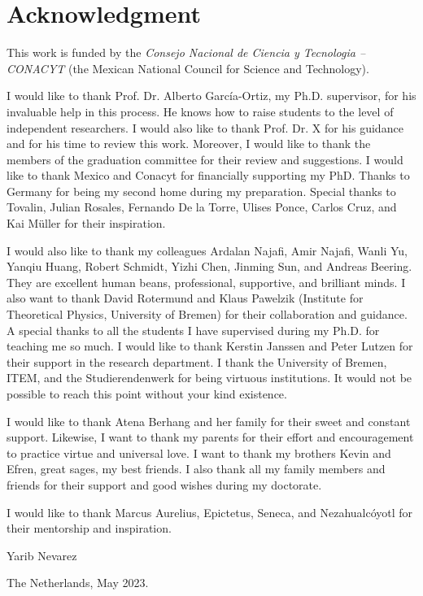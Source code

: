 \chapter*{Acknowledgment}
\thispagestyle{empty}
This work is funded by the \textit{Consejo Nacional de Ciencia y Tecnologia -- CONACYT} (the Mexican National Council for Science and Technology).

I would like to thank Prof. Dr. Alberto Garc\'ia-Ortiz, my Ph.D. supervisor, for his invaluable help in this process. He knows how to raise students to the level of independent researchers. I would also like to thank Prof. Dr. X for his guidance and for his time to review this work. Moreover, I would like to thank the members of the graduation committee for their review and suggestions. I would like to thank Mexico and Conacyt for financially supporting my PhD. Thanks to Germany for being my second home during my preparation. Special thanks to Tovalin, Julian Rosales, Fernando De la Torre, Ulises Ponce, Carlos Cruz, and Kai M\"uller for their inspiration.

I would also like to thank my colleagues Ardalan Najafi, Amir Najafi, Wanli Yu, Yanqiu Huang, Robert Schmidt, Yizhi Chen, Jinming Sun, and Andreas Beering. They are excellent human beans, professional, supportive, and brilliant minds. I also want to thank David Rotermund and Klaus Pawelzik (Institute for Theoretical Physics, University of Bremen) for their collaboration and guidance. A special thanks to all the students I have supervised during my Ph.D. for teaching me so much. I would like to thank Kerstin Janssen and Peter Lutzen for their support in the research department. I thank the University of Bremen, ITEM, and the Studierendenwerk for being virtuous institutions. It would not be possible to reach this point without your kind existence.


I would like to thank Atena Berhang and her family for their sweet and constant support. Likewise, I want to thank my parents for their effort and encouragement to practice virtue and universal love. I want to thank my brothers Kevin and Efren, great sages, my best friends. I also thank all my family members and friends for their support and good wishes during my doctorate.

I would like to thank Marcus Aurelius, Epictetus, Seneca, and Nezahualc\'oyotl for their mentorship and inspiration.


Yarib Nevarez

The Netherlands, May 2023.




